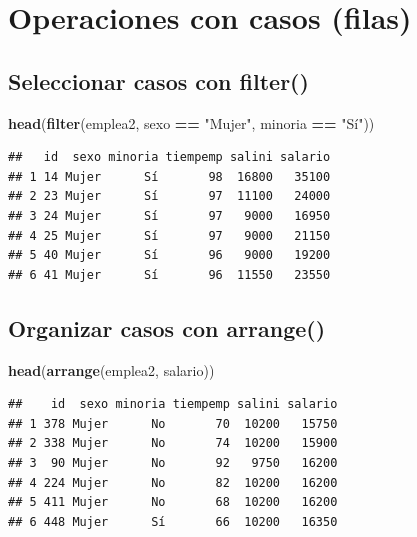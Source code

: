 \documentclass[]{book}
\newenvironment{Shaded}{\begin{snugshade}}{\end{snugshade}}
\newcommand{\KeywordTok}[1]{\textcolor[rgb]{0.13,0.29,0.53}{\textbf{#1}}}
\newcommand{\StringTok}[1]{\textcolor[rgb]{0.31,0.60,0.02}{#1}}
\newcommand{\OperatorTok}[1]{\textcolor[rgb]{0.81,0.36,0.00}{\textbf{#1}}}
\newcommand{\NormalTok}[1]{#1}
\begin{document}
\section{Operaciones con casos
(filas)}\label{operaciones-con-casos-filas}

\subsection{\texorpdfstring{Seleccionar casos con
\textbf{filter()}}{Seleccionar casos con filter()}}\label{seleccionar-casos-con-filter}

\begin{Shaded}
\begin{Highlighting}[]
\KeywordTok{head}\NormalTok{(}\KeywordTok{filter}\NormalTok{(emplea2, sexo }\OperatorTok{==}\StringTok{ "Mujer"}\NormalTok{, minoria }\OperatorTok{==}\StringTok{ "Sí"}\NormalTok{))}
\end{Highlighting}
\end{Shaded}

\begin{verbatim}
##   id  sexo minoria tiempemp salini salario
## 1 14 Mujer      Sí       98  16800   35100
## 2 23 Mujer      Sí       97  11100   24000
## 3 24 Mujer      Sí       97   9000   16950
## 4 25 Mujer      Sí       97   9000   21150
## 5 40 Mujer      Sí       96   9000   19200
## 6 41 Mujer      Sí       96  11550   23550
\end{verbatim}

\subsection{\texorpdfstring{Organizar casos con
\textbf{arrange()}}{Organizar casos con arrange()}}\label{organizar-casos-con-arrange}

\begin{Shaded}
\begin{Highlighting}[]
\KeywordTok{head}\NormalTok{(}\KeywordTok{arrange}\NormalTok{(emplea2, salario))}
\end{Highlighting}
\end{Shaded}

\begin{verbatim}
##    id  sexo minoria tiempemp salini salario
## 1 378 Mujer      No       70  10200   15750
## 2 338 Mujer      No       74  10200   15900
## 3  90 Mujer      No       92   9750   16200
## 4 224 Mujer      No       82  10200   16200
## 5 411 Mujer      No       68  10200   16200
## 6 448 Mujer      Sí       66  10200   16350
\end{verbatim}
\end{document}
